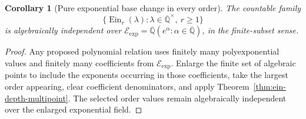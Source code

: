 \documentclass[11pt]{article}
\newtheorem{corollary}[theorem]{Corollary}
\theoremstyle{definition}
\theoremstyle{remark}
\newcommand{\Qbar}{\overline{\mathbb Q}}
\newcommand{\EinDepth}[1]{\operatorname{Ein}_{#1}}
\newcommand{\Eexp}{\mathcal E_{\mathrm{exp}}}
\begin{document}
\begin{corollary}[Pure exponential base change in every order]
\label{cor:ein-depth-pure-exponential}
The countable family
\[
 \bigl\{\EinDepth{r}(\lambda):
      \lambda\in\Qbar^\times,\ r\geq1\bigr\}
\]
is algebraically independent over
\(\Eexp=\Qbar(e^\alpha:\alpha\in\Qbar)\), in the finite-subset sense.
\end{corollary}

\begin{proof}
Any proposed polynomial relation uses finitely many polyexponential values and
finitely many coefficients from \(\Eexp\).  Enlarge the finite set of
algebraic points to include the exponents occurring in those coefficients,
take the largest order appearing, clear coefficient denominators, and
apply Theorem~\ref{thm:ein-depth-multipoint}.  The selected order values
remain algebraically independent over the enlarged exponential field.
\end{proof}
\end{document}
